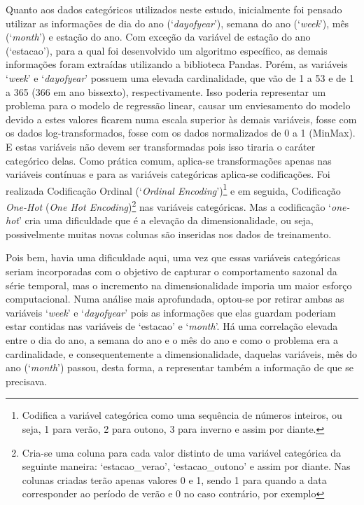 Quanto aos dados categóricos utilizados neste estudo, inicialmente foi pensado utilizar as informações de dia do ano (`\textit{dayofyear}'), semana do ano (`\textit{week}'), mês (`\textit{month}') e estação do ano. Com exceção da variável de estação do ano (`estacao'), para a qual foi desenvolvido um algoritmo específico, as demais informações foram extraídas utilizando a biblioteca Pandas.\cite{mckinney2011pandas} Porém, as variáveis `\textit{week}' e `\textit{dayofyear}' possuem uma elevada cardinalidade, que vão de 1 a 53 e de 1 a 365 (366 em ano bissexto), respectivamente. Isso poderia representar um problema para o modelo de regressão linear, causar um enviesamento do modelo devido a estes valores ficarem numa escala superior às demais variáveis, fosse com os dados log-transformados, fosse com os dados normalizados de 0 a 1 (MinMax). E estas variáveis não devem ser transformadas pois isso tiraria o caráter categórico delas. Como prática comum, aplica-se transformações apenas nas variáveis contínuas  e para as variáveis categóricas aplica-se codificações. Foi realizada Codificação Ordinal (`\textit{Ordinal Encoding}')\footnote{Codifica a variável categórica como uma sequência de números inteiros, ou seja, 1 para verão, 2 para outono, 3 para inverno e assim por diante.} e em seguida, Codificação \textit{One-Hot} (\textit{One Hot Encoding})\footnote{Cria-se uma coluna para cada valor distinto de uma variável categórica da seguinte maneira: `estacao\_verao', `estacao\_outono' e assim por diante. Nas colunas criadas terão apenas valores 0 e 1, sendo 1 para quando a data corresponder ao período de verão e 0 no caso contrário, por exemplo} nas variáveis categóricas. Mas a codificação `\textit{one-hot}' cria uma dificuldade que é a elevação da dimensionalidade, ou seja, possivelmente muitas novas colunas são inseridas nos dados de treinamento.

Pois bem, havia uma dificuldade aqui, uma vez que essas variáveis categóricas seriam incorporadas com o objetivo de capturar o comportamento sazonal da série temporal, mas o incremento na dimensionalidade imporia um maior esforço computacional. Numa análise mais aprofundada, optou-se por retirar ambas as variáveis `\textit{week}' e `\textit{dayofyear}' pois as informações que elas guardam poderiam estar contidas nas variáveis de `estacao' e `\textit{month}'. Há uma correlação elevada entre o dia do ano, a semana do ano e o mês do ano e como o problema era a cardinalidade, e consequentemente a dimensionalidade, daquelas variáveis, mês do ano (`\textit{month}') passou, desta forma, a representar também a informação de que se precisava.

